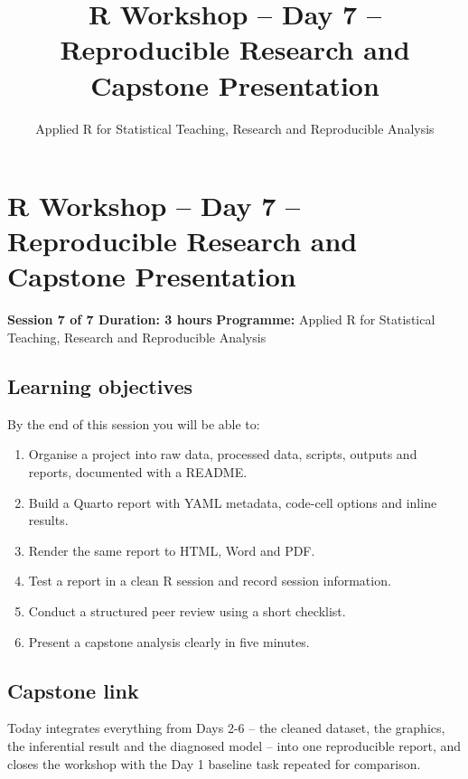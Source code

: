 \documentclass[11pt]{article}
\title{R Workshop -- Day 7 -- Reproducible Research and Capstone Presentation}
\author{Applied R for Statistical Teaching, Research and Reproducible Analysis}
\date{}
\providecommand{\tightlist}{%
  \setlength{\itemsep}{0pt}\setlength{\parskip}{0pt}}
\begin{document}
\maketitle
\tableofcontents
\newpage
\hypertarget{r-workshop-day-7-reproducible-research-and-capstone-presentation}{%
\section{R Workshop -- Day 7 -- Reproducible Research and Capstone
Presentation}\label{r-workshop-day-7-reproducible-research-and-capstone-presentation}}

\textbf{Session 7 of 7 \textbar{} Duration: 3 hours} \textbf{Programme:}
Applied R for Statistical Teaching, Research and Reproducible Analysis

\hypertarget{learning-objectives}{%
\subsection{Learning objectives}\label{learning-objectives}}

By the end of this session you will be able to:

\begin{enumerate}
\def\labelenumi{\arabic{enumi}.}
\tightlist
\item
  Organise a project into raw data, processed data, scripts, outputs and
  reports, documented with a README.
\item
  Build a Quarto report with YAML metadata, code-cell options and inline
  results.
\item
  Render the same report to HTML, Word and PDF.
\item
  Test a report in a clean R session and record session information.
\item
  Conduct a structured peer review using a short checklist.
\item
  Present a capstone analysis clearly in five minutes.
\end{enumerate}

\hypertarget{capstone-link}{%
\subsection{Capstone link}\label{capstone-link}}

Today integrates everything from Days 2-6 -- the cleaned dataset, the
graphics, the inferential result and the diagnosed model -- into one
reproducible report, and closes the workshop with the Day 1 baseline
task repeated for comparison.
\end{document}
